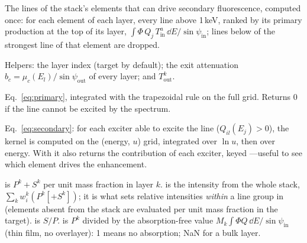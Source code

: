 The lines of the stack's elements that can drive secondary fluorescence, computed once: for
each element of each layer, every line above 1\,keV, ranked by its primary production at the
top of its layer, $\int\Phi\,Q_j\,T_\mathrm{in}^a\,\dd E/\sin\psi_\mathrm{in}$; lines below
 of the strongest line of that element are dropped.

Helpers: the layer index (target by default); the exit attenuation $b_c = \mu_c(E_l)/
\sin\psi_\mathrm{out}$ of every layer; and $T_\mathrm{out}^k$.

Eq.~\eqref{eq:primary}, integrated with the trapezoidal rule on the full grid. Returns 0 if
the line cannot be excited by the spectrum.

Eq.~\eqref{eq:secondary}: for each exciter able to excite the line
($Q_{il}(E_j) > 0$), the kernel is computed on the (energy, $u$) grid, integrated over
$\ln u$, then over energy. With  it also returns the contribution of each
exciter, keyed ---useful to see which element drives the
enhancement.

 is $P^k + S^k$ per unit mass fraction in layer $k$.  is the
intensity from the whole stack, $\sum_k w_i^k(P^k [+S^k])$; it is what sets relative
intensities \emph{within} a line group in  (elements absent from the stack are
evaluated per unit mass fraction in the target).  is $S/P$.
 is $P^k$ divided by the absorption-free value $M_k\int\Phi
Q\,\dd E/\sin\psi_\mathrm{in}$ (thin film, no overlayer): 1 means no absorption; NaN for a
bulk layer.

